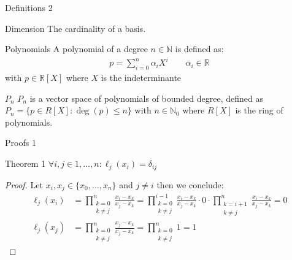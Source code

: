\documentclass[8pt]{beamer}
\begin{document}
	\begin{frame}{Definitions 2}
		\begin{block}{Dimension}
			The cardinality of a basis. \cite{basis}
		\end{block}
		\begin{block}{Polynomials}
			A polynomial of a degree $n\in \mathbb{N}$ is defined as: 
			\begin{align*}
				p = \sum_{i = 0}^{n} \alpha_i X^i\qquad \alpha_i \in \mathbb{R}
			\end{align*}
			with $p\in \mathbb{R}[X]$ where $X$ is the indeterminante 
		\end{block}
		\begin{block}{$P_n$}
			$P_n$ is a vector space of polynomials of bounded degree, defined as $P_n = \{p \in R[X] : \deg(p) \leq n \}$ with $n \in \mathbb{N}_0$ where $R[X]$ is the ring of polynomials.\cite{lagrange}
		\end{block}
	\end{frame}
	
	\begin{frame}{Proofs 1}
		\begin{block}{Theorem 1}
			$\forall i,j \in1,\ldots,n:\ell_j(x_i) = \delta_{ij}$
		\end{block}
		\begin{proof}
			Let $x_i, x_j \in \{x_0, \ldots, x_n \}$ and $j \neq i$ then we conclude: 
			\begin{align*}
				\ell_j(x_i) &= \prod_{\substack{k= 0 \\ k \neq j }}^{n}\frac{x_i - x_k}{x_j - x_k} = \prod_{\substack{k= 0 \\ k \neq j}}^{i-1}\frac{x_i - x_k}{x_j - x_k} \cdot 0 \cdot \prod_{\substack{k= i+1 \\ k \neq j}}^{n}\frac{x_i - x_k}{x_j - x_k} = 0 \\
				\ell_j(x_j) &= \prod_{\substack{k= 0 \\ k \neq j }}^{n}\frac{x_j - x_k}{x_j - x_k} =  \prod_{\substack{k= 0 \\ k \neq j }}^{n} 1 = 1
			\end{align*}
		\end{proof}
	\end{frame}
			
\end{document}

